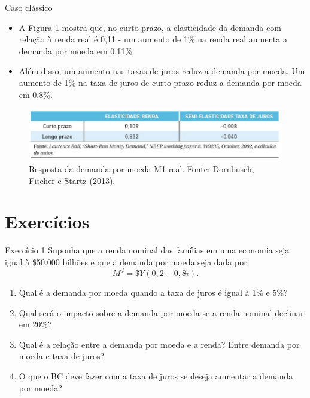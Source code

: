\documentclass[10pt]{beamer}
\begin{document}
\begin{frame}[t]{Caso clássico}
\begin{itemize}
    \item A Figura \ref{fig7} mostra que, no curto prazo, a elasticidade da demanda com relação à renda real é 0,11 - um aumento de 1\% na renda real aumenta a demanda por moeda em 0,11\%.
    \bigskip
    \item Além disso, um aumento nas taxas de juros reduz a demanda por moeda. Um aumento de 1\% na taxa de juros de curto prazo reduz a demanda por moeda em 0,8\%.
    \bigskip
\end{itemize}
    \begin{figure}
        \centering
        \includegraphics[width=\textwidth]{./figures/aula102_fig7.JPG}
        \caption{Resposta da demanda por moeda M1 real. Fonte: Dornbusch, Fischer e Startz (2013).}
        \label{fig7}
    \end{figure}
\end{frame}

\section{Exercícios}

\begin{frame}[t]{Exercício 1}
    Suponha que a renda nominal das famílias em uma economia seja igual à \$50.000 bilhões e que a demanda por moeda seja dada por:
    \[
    M^d = \$Y(0,2-0,8i).
    \]
    \bigskip
    \begin{enumerate}
        \item Qual é a demanda por moeda quando a taxa de juros é igual à 1\% e 5\%?
        \bigskip
        \item Qual será o impacto sobre a demanda por moeda se a renda nominal declinar em 20\%?
        \bigskip
        \item Qual é a relação entre a demanda por moeda e a renda? Entre demanda por moeda e taxa de juros?
        \bigskip
        \item O que o BC deve fazer com a taxa de juros se deseja aumentar a demanda por moeda?
    \end{enumerate}
\end{frame}
\end{document}

